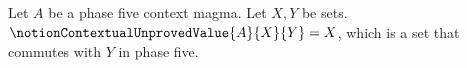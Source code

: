 


\begin{definition}\label{notion_contextual_unproved_value}
    Let $A$ be a phase five context magma.
    Let $X,Y$ be sets.
    $\notionContextualUnprovedValue{A}{X}{Y}=X$, which is a set
        that commutes with $Y$ in phase five.
\end{definition}
